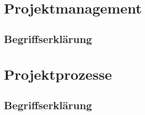 \section{Projektmanagement}

\subsection{Begriffserklärung}

\section{Projektprozesse}

\subsection{Begriffserklärung}